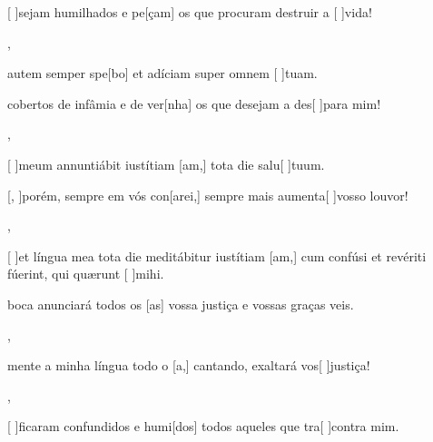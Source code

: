 {    {\item {}[ ]{se}jam humilhados e pe[çam] os que procuram destruir a [ ]{vi}da!},
  {\item {} autem semper spe[bo] et adíciam super omnem [ ]{tu}am.}%
    {\item {} cobertos de infâmia e de ver[nha] os que desejam a des[ ]{pa}ra mim!},
  {\item {}[ ]{me}um annuntiábit iustítiam [am,] tota die salu[ ]{tu}um.}%
    {\item {}[, ]{po}rém, sempre em vós con[arei,] sempre mais aumenta[ ]{vos}{so} louvor!},
  {\item {}[ ]{et} língua mea tota die meditábitur iustítiam [am,] cum confúsi et revériti fúerint, qui quærunt [ ]{mi}hi.}%
    {\item {} boca anunciará todos os [as] vossa justiça e vossas graças veis.},
  {}%
    {\item {}mente a minha língua todo o [a,] cantando, exaltará vos[ ]{jus}{ti}ça!},
  {}%
    {\item {}[ ]{fi}caram confundidos e humi[dos] todos aqueles que tra[ ]{con}tra mim.}
}